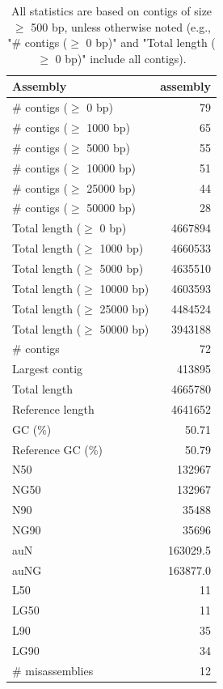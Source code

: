 \documentclass[12pt,a4paper]{article}
\begin{document}
\begin{table}[ht]
\begin{center}
\caption{All statistics are based on contigs of size $\geq$ 500 bp, unless otherwise noted (e.g., "\# contigs ($\geq$ 0 bp)" and "Total length ($\geq$ 0 bp)" include all contigs).}
\begin{tabular}{|l*{1}{|r}|}
\hline
Assembly & assembly \\ \hline
\# contigs ($\geq$ 0 bp) & 79 \\ \hline
\# contigs ($\geq$ 1000 bp) & 65 \\ \hline
\# contigs ($\geq$ 5000 bp) & 55 \\ \hline
\# contigs ($\geq$ 10000 bp) & 51 \\ \hline
\# contigs ($\geq$ 25000 bp) & 44 \\ \hline
\# contigs ($\geq$ 50000 bp) & 28 \\ \hline
Total length ($\geq$ 0 bp) & 4667894 \\ \hline
Total length ($\geq$ 1000 bp) & 4660533 \\ \hline
Total length ($\geq$ 5000 bp) & 4635510 \\ \hline
Total length ($\geq$ 10000 bp) & 4603593 \\ \hline
Total length ($\geq$ 25000 bp) & 4484524 \\ \hline
Total length ($\geq$ 50000 bp) & 3943188 \\ \hline
\# contigs & 72 \\ \hline
Largest contig & 413895 \\ \hline
Total length & 4665780 \\ \hline
Reference length & 4641652 \\ \hline
GC (\%) & 50.71 \\ \hline
Reference GC (\%) & 50.79 \\ \hline
N50 & 132967 \\ \hline
NG50 & 132967 \\ \hline
N90 & 35488 \\ \hline
NG90 & 35696 \\ \hline
auN & 163029.5 \\ \hline
auNG & 163877.0 \\ \hline
L50 & 11 \\ \hline
LG50 & 11 \\ \hline
L90 & 35 \\ \hline
LG90 & 34 \\ \hline
\# misassemblies & 12 \\ \hline

\end{tabular}
\end{center}
\end{table}
\end{document}
